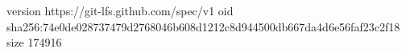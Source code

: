 version https://git-lfs.github.com/spec/v1
oid sha256:74e0de028737479d2768046b608d1212c8d944500db667da4d6e56faf23c2f18
size 174916

